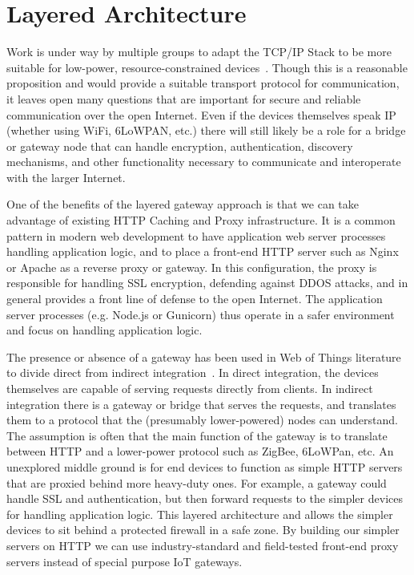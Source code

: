 \documentclass{acm_proc_article-sp}
\begin{document}
\section{Layered Architecture}

Work is under way by multiple groups to adapt the TCP/IP Stack to be more
suitable for low-power, resource-constrained devices~\cite{iotsurvey}. Though
this is a reasonable proposition and would provide a suitable transport
protocol for communication, it leaves open many questions that are important
for secure and reliable communication over the open Internet. Even if the
devices themselves speak IP (whether using WiFi, 6LoWPAN, etc.) there will
still likely be a role for a bridge or gateway node that can handle encryption,
authentication, discovery mechanisms, and other functionality necessary to
communicate and interoperate with the larger Internet.

One of the benefits of the layered gateway approach is that we can take
advantage of existing HTTP Caching and Proxy infrastructure. It is a common
pattern in modern web development to have application web server processes
handling application logic, and to place a front-end HTTP server such as Nginx
or Apache as a reverse proxy or gateway.  In this configuration, the proxy is
responsible for handling SSL encryption, defending against DDOS attacks, and in
general provides a front line of defense to the open Internet. The application
server processes (e.g.  Node.js or Gunicorn) thus operate in a safer
environment and focus on handling application logic.

The presence or absence of a gateway has been used in Web of Things literature
to divide direct from indirect integration~\cite{wotsurvey}. In direct
integration, the devices themselves are capable of serving requests directly
from clients. In indirect integration there is a gateway or bridge that serves
the requests, and translates them to a protocol that the (presumably
lower-powered) nodes can understand. The assumption is often that the main
function of the gateway is to translate between HTTP and a lower-power protocol
such as ZigBee, 6LoWPan, etc. An unexplored middle ground is for end devices to
function as simple HTTP servers that are proxied behind more heavy-duty ones.
For example, a gateway could handle SSL and authentication, but then forward
requests to the simpler devices for handling application logic. This layered
architecture  and allows the simpler devices to sit behind a protected firewall
in a safe zone. By building our simpler servers on HTTP we can use
industry-standard and field-tested front-end proxy servers instead of special
purpose IoT gateways.
\end{document}

